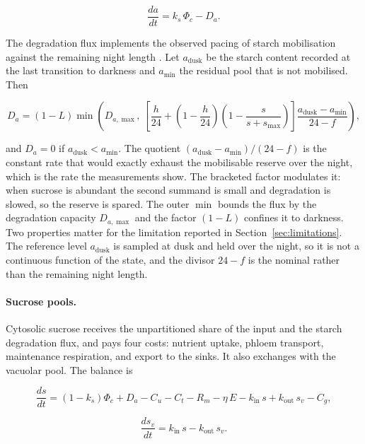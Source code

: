 \begin{equation}
\frac{da}{dt} = k_s\,\Phi_c - D_a .
\label{eq:starch}
\end{equation}

The degradation flux implements the observed pacing of starch mobilisation
against the remaining night length \citep{Graf2010,Scialdone2013}. Let
$a_{\mathrm{dusk}}$ be the starch content recorded at the last transition to
darkness and $a_{\min}$ the residual pool that is not mobilised. Then

\begin{equation}
D_a =
\left(1-L\right)
\min\!\left(
D_{a,\max},\;
\left[
\frac{h}{24} + \left(1-\frac{h}{24}\right)\left(1-\frac{s}{s+s_{\max}}\right)
\right]
\frac{a_{\mathrm{dusk}} - a_{\min}}{24 - f}
\right),
\label{eq:starch_degradation}
\end{equation}

and $D_a = 0$ if $a_{\mathrm{dusk}} < a_{\min}$. The quotient
$(a_{\mathrm{dusk}}-a_{\min})/(24-f)$ is the constant rate that would exactly
exhaust the mobilisable reserve over the night, which is the rate the
measurements show. The bracketed factor modulates it: when sucrose is abundant
the second summand is small and degradation is slowed, so the reserve is spared.
The outer $\min$ bounds the flux by the degradation capacity $D_{a,\max}$ and the
factor $(1-L)$ confines it to darkness. Two properties matter for the limitation
reported in Section~\ref{sec:limitations}. The reference level
$a_{\mathrm{dusk}}$ is sampled at dusk and held over the night, so it is not a
continuous function of the state, and the divisor $24-f$ is the nominal rather
than the remaining night length.

\paragraph{Sucrose pools.}
Cytosolic sucrose receives the unpartitioned share of the input and the starch
degradation flux, and pays four costs: nutrient uptake, phloem transport,
maintenance respiration, and export to the sinks. It also exchanges with the
vacuolar pool. The balance is

\begin{equation}
\frac{ds}{dt}
= \left(1-k_s\right)\Phi_c
+ D_a
- C_u
- C_t
- R_m
- \eta\,E
- k_{\mathrm{in}}\,s
+ k_{\mathrm{out}}\,s_v
- C_g ,
\label{eq:sucrose}
\end{equation}

\begin{equation}
\frac{ds_v}{dt} = k_{\mathrm{in}}\,s - k_{\mathrm{out}}\,s_v .
\label{eq:sucrose_vac}
\end{equation}

